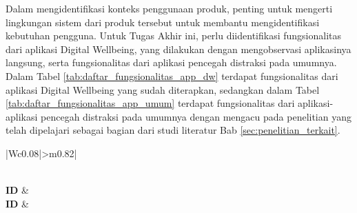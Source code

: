 Dalam mengidentifikasi konteks penggunaan produk, penting untuk mengerti lingkungan sistem dari produk tersebut untuk membantu mengidentifikasi kebutuhan pengguna. Untuk Tugas Akhir ini, perlu diidentifikasi fungsionalitas dari aplikasi Digital Wellbeing, yang dilakukan dengan mengobservasi aplikasinya langsung, serta fungsionalitas dari aplikasi pencegah distraksi pada umumnya. Dalam Tabel \ref{tab:daftar_fungsionalitas_app_dw} terdapat fungsionalitas dari aplikasi Digital Wellbeing yang sudah diterapkan, sedangkan dalam Tabel \ref{tab:daftar_fungsionalitas_app_umum} terdapat fungsionalitas dari aplikasi-aplikasi pencegah distraksi pada umumnya dengan mengacu pada penelitian yang telah dipelajari sebagai bagian dari studi literatur Bab \ref{sec:penelitian_terkait}.

\RaggedLeft
\begin{small}
\begin{longtable}[c]{|W{c}{0.08\textwidth}|>{\ccnormspacing}m{0.82\textwidth}|}
  \caption{Daftar Fungsionalitas Aplikasi Digital Wellbeing}
  \label{tab:daftar_fungsionalitas_app_dw} \\
  \hline {} \textbf{ID} &  \\ \hline \endfirsthead
  \hline {} \textbf{ID} &  \\ \hline \endhead
  
  \hline \endfoot
  

\end{longtable}
\end{small}
